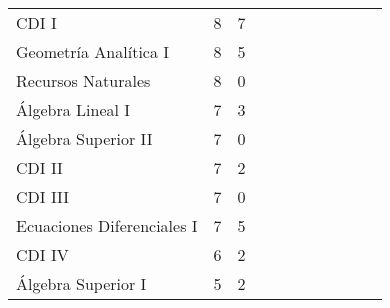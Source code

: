 \begin{table}[h!]
\begin{tabular}{l|ll|llllllll}
CDI I                        & 8        & 7                   & \cellcolor{blue!25} &                     & \cellcolor{blue!25} & \cellcolor{blue!25} &                     &                     & \cellcolor{blue!25} &                     \\
Geometría Analítica I        & 8        & 5                   & \cellcolor{blue!25} &                     & \cellcolor{blue!25} & \cellcolor{blue!25} &                     &                     & \cellcolor{blue!25} &                     \\
Recursos Naturales           & 8        & 0                   &                     &                     &                     &                     &                     &                     &                     & \cellcolor{blue!25} \\
Álgebra Lineal I             & 7        & 3                   & \cellcolor{blue!25} & \cellcolor{blue!25} & \cellcolor{blue!25} & \cellcolor{blue!25} &                     &                     & \cellcolor{blue!25} &                     \\
Álgebra Superior II          & 7        & 0                   & \cellcolor{blue!25} & \cellcolor{blue!25} &                     & \cellcolor{blue!25} &                     &                     & \cellcolor{blue!25} &                     \\
CDI II                       & 7        & 2                   & \cellcolor{blue!25} &                     & \cellcolor{blue!25} & \cellcolor{blue!25} &                     &                     & \cellcolor{blue!25} &                     \\
CDI III                      & 7        & 0                   & \cellcolor{blue!25} &                     & \cellcolor{blue!25} & \cellcolor{blue!25} &                     &                     & \cellcolor{blue!25} &                     \\
Ecuaciones Diferenciales I   & 7        & 5                   & \cellcolor{blue!25} &                     & \cellcolor{blue!25} & \cellcolor{blue!25} &                     &                     & \cellcolor{blue!25} &                     \\
CDI IV                       & 6        & 2                   & \cellcolor{blue!25} &                     & \cellcolor{blue!25} & \cellcolor{blue!25} &                     &                     & \cellcolor{blue!25} &                     \\
Álgebra Superior I           & 5        & 2                   & \cellcolor{blue!25} & \cellcolor{blue!25} &                     & \cellcolor{blue!25} &                     &                     & \cellcolor{blue!25} &                     \\

\end{tabular}
\end{table}
